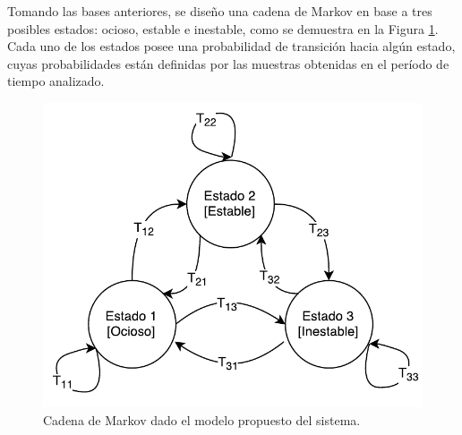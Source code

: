 

Tomando las bases anteriores, se diseño una cadena de Markov en base a tres posibles estados: ocioso, estable e inestable, como se demuestra en la Figura \ref{fig:cadenaMarkovPredictiva}. Cada uno de los estados posee una probabilidad de transición hacia algún estado, cuyas probabilidades están definidas por las muestras obtenidas en el período de tiempo analizado.

\begin{figure}[ht!]
  \centering
    \includegraphics[scale=0.75]{images/CadenaMarkovPredictiva.pdf}
  \caption{Cadena de Markov dado el modelo propuesto del sistema.}
  \label{fig:cadenaMarkovPredictiva}
\end{figure}


